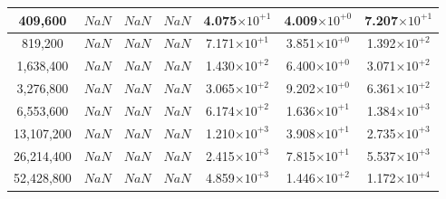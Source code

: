 \documentclass[12pt,a4paper]{article}
\begin{document}
\begin{landscape}
\begin{center}
\begin{longtable}{@{}|c|c|c|c|c|c|c|@{}}
{ 409,600}    & { $NaN$}                & { $NaN$}                & { $NaN$}                & { 4.075$\times10^{+1}$} & { 4.009$\times10^{+0}$} & { 7.207$\times10^{+1}$} \\ \midrule
{ 819,200}    & { $NaN$}                & { $NaN$}                & { $NaN$}                & { 7.171$\times10^{+1}$} & { 3.851$\times10^{+0}$} & { 1.392$\times10^{+2}$} \\ \midrule
{ 1,638,400}  & { $NaN$}                & { $NaN$}                & { $NaN$}                & { 1.430$\times10^{+2}$} & { 6.400$\times10^{+0}$} & { 3.071$\times10^{+2}$} \\ \midrule
{ 3,276,800}  & { $NaN$}                & { $NaN$}                & { $NaN$}                & { 3.065$\times10^{+2}$} & { 9.202$\times10^{+0}$} & { 6.361$\times10^{+2}$} \\ \midrule
{ 6,553,600}  & { $NaN$}                & { $NaN$}                & { $NaN$}                & { 6.174$\times10^{+2}$} & { 1.636$\times10^{+1}$} & { 1.384$\times10^{+3}$} \\ \midrule
{ 13,107,200} & { $NaN$}                & { $NaN$}                & { $NaN$}                & { 1.210$\times10^{+3}$} & { 3.908$\times10^{+1}$} & { 2.735$\times10^{+3}$} \\ \midrule
{ 26,214,400} & { $NaN$}                & { $NaN$}                & { $NaN$}                & { 2.415$\times10^{+3}$} & { 7.815$\times10^{+1}$} & { 5.537$\times10^{+3}$} \\ \midrule
{ 52,428,800} & { $NaN$}                & { $NaN$}                & { $NaN$}                & { 4.859$\times10^{+3}$} & { 1.446$\times10^{+2}$} & { 1.172$\times10^{+4}$}  \\\midrule

\end{longtable}
\label{benchmarkTable}
\end{center}
\end{landscape}






\end{document}
